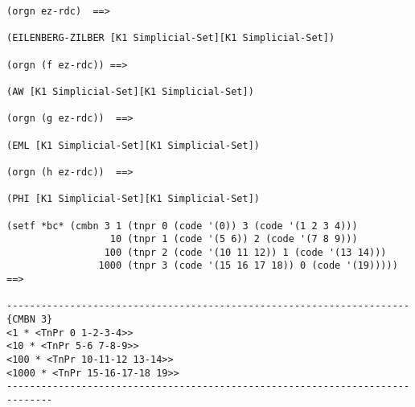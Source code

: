{\footnotesize\begin{verbatim}
(orgn ez-rdc)  ==>

(EILENBERG-ZILBER [K1 Simplicial-Set][K1 Simplicial-Set])

(orgn (f ez-rdc)) ==>

(AW [K1 Simplicial-Set][K1 Simplicial-Set])

(orgn (g ez-rdc))  ==>

(EML [K1 Simplicial-Set][K1 Simplicial-Set])

(orgn (h ez-rdc))  ==>

(PHI [K1 Simplicial-Set][K1 Simplicial-Set])

(setf *bc* (cmbn 3 1 (tnpr 0 (code '(0)) 3 (code '(1 2 3 4)))
                  10 (tnpr 1 (code '(5 6)) 2 (code '(7 8 9)))
                 100 (tnpr 2 (code '(10 11 12)) 1 (code '(13 14)))
                1000 (tnpr 3 (code '(15 16 17 18)) 0 (code '(19)))))  ==>

----------------------------------------------------------------------{CMBN 3}
<1 * <TnPr 0 1-2-3-4>>
<10 * <TnPr 5-6 7-8-9>>
<100 * <TnPr 10-11-12 13-14>>
<1000 * <TnPr 15-16-17-18 19>>
------------------------------------------------------------------------------
\end{verbatim}}
\newpage
